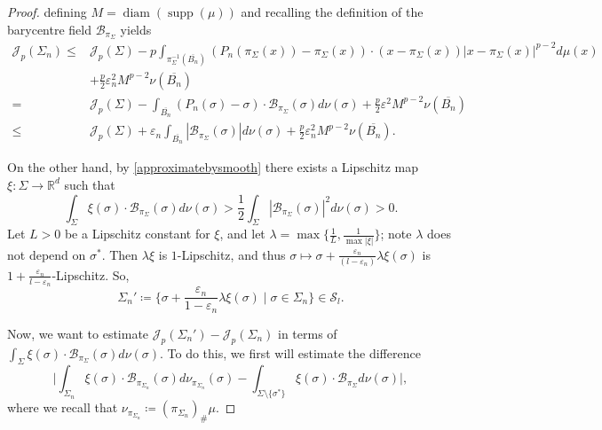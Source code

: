 \documentclass[10pt,a4paper]{amsart}
\DeclareMathOperator*{\diam}{diam}
\DeclareMathOperator*{\supp}{supp}
\renewcommand{\epsilon}{\varepsilon}
\begin{document}
\begin{proof}
  defining $M = \diam(\supp(\mu))$ and recalling the definition of the
  barycentre field $\mathcal{B}_{\pi_{\Sigma}}$ yields
  \begin{align}\label{eq:Sigma-n-Sigma} \nonumber
    \mathscr{J}_p(\Sigma_{n}) \leq
    & \mathscr{J}_p(\Sigma) - p\int_{\pi_{\Sigma}^{-1}(
      \overline{B_n})}(P_{n}(\pi_{\Sigma}(x)) - \pi_{\Sigma}(x))\cdot
      (x - \pi_{\Sigma}(x))|x - \pi_{\Sigma}(x)|^{p-2} d\mu(x) \\
    \nonumber
    &+ \frac{p}{2} \epsilon_n^2 M^{p-2} \nu(\overline{B_n}) \\
    \nonumber
    =& \mathscr{J}_p(\Sigma) - \int_{ \overline{B_n}}(P_{n}(\sigma) -
       \sigma)\cdot \mathcal{B}_{\pi_{\Sigma}}(\sigma) d\nu(\sigma) +
       \frac{p}{2} \epsilon^2 M^{p-2}\nu(\overline{B_n}) \\
    \leq
    & \mathscr{J}_p(\Sigma) + \epsilon_n
      \int_{\overline{B_n}}|\mathcal{B}_{\pi_{\Sigma}}(\sigma)|
      d\nu(\sigma) +\frac{p}{2} \epsilon_n^2
      M^{p-2}\nu(\overline{B_n}).
  \end{align}

  On the other hand, by \cref{approximatebysmooth} there exists a
  Lipschitz map $\xi: \Sigma \to \mathbb{R}^d$ such that
  \begin{equation}
    \int_{\Sigma}\xi(\sigma)\cdot
    \mathcal{B}_{\pi_{\Sigma}}(\sigma)d\nu(\sigma) >
    \frac{1}{2}\int_{\Sigma}|\mathcal{B}_{\pi_{\Sigma}}(\sigma)|^2
    d\nu(\sigma) > 0. \label{eq:applying-lem-2-11}
  \end{equation}
  Let $L >0$ be a Lipschitz constant for $\xi$, and let $\lambda =
  \max\{\frac{1}{L}, \frac{1}{\max |\xi|}\}$; note $\lambda$ does not
  depend on $\sigma^*$. Then $\lambda \xi$ is $1$-Lipschitz, and thus
  $\sigma \mapsto \sigma + \frac{\epsilon_n}{(l - \epsilon_n)}\lambda
  \xi(\sigma)$ is $1 + \frac{\epsilon_n}{l - \epsilon_n}$-Lipschitz.
  So,
  \[
    \Sigma_n' \coloneqq \{\sigma + \frac{\epsilon_n}{1 -
      \epsilon_n}\lambda \xi(\sigma) \mid \sigma \in \Sigma_{n}\} \in
    \mathcal{S}_l.
  \]

  Now, we want to estimate $\mathscr{J}_p(\Sigma_n') -
  \mathscr{J}_p(\Sigma_n)$ in terms of $\int_{\Sigma}\xi(\sigma)\cdot
  \mathcal{B}_{\pi_{\Sigma}}(\sigma)d\nu(\sigma)$. To do this, we
  first will estimate the difference
  \[
    \bigg|\int_{\Sigma_n} \xi(\sigma)\cdot
    \mathcal{B}_{\pi_{\Sigma_n}}(\sigma)d\nu_{\pi_{\Sigma_n}}(\sigma)
    - \int_{\Sigma \setminus \{\sigma^*\}}\xi(\sigma)\cdot
    \mathcal{B}_{\pi_{\Sigma}}d\nu(\sigma)\bigg|,
  \]
  where we recall that $\nu_{\pi_{\Sigma_n}} \coloneqq
  (\pi_{\Sigma_n})_{\#}\mu$.


\end{proof}
\end{document}
